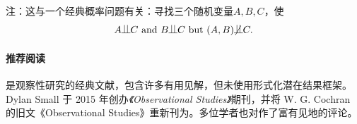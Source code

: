注：这与一个经典概率问题有关：寻找三个随机变量$A,B,C$，使
$$
A\ind C \text{ and } B\ind C \text{ but } (A,B) \nind C.
$$


\paragraph{推荐阅读}


\citet{cochran1965planning}是观察性研究的经典文献，包含许多有用见解，但未使用形式化潜在结果框架。Dylan Small 于 2015 年创办{\it《Observational Studies》}期刊\citep{small2015introduction}，并将 W. G. Cochran 的旧文《Observational Studies》重新刊为\citet{cochran2015}。多位学者也对\citet{cochran2015}作了富有见地的评论。 

